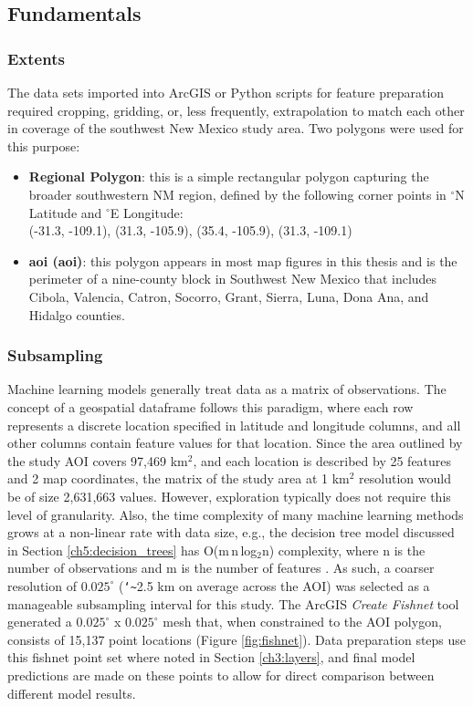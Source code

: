 \subsection{Fundamentals}

\subsubsection{Extents}

The data sets imported into ArcGIS or Python scripts for feature preparation required cropping, gridding, or, less frequently, extrapolation to match each other in coverage of the southwest New Mexico study area. Two polygons were used for this purpose:

\begin{itemize}
\item \textbf{Regional Polygon}: this is a simple rectangular polygon capturing the broader southwestern NM region, defined by the following corner points in $^\circ$N Latitude and $^\circ$E Longitude: \\ (-31.3, -109.1), (31.3, -105.9), (35.4, -105.9), (31.3, -109.1)
\item \textbf{\acrlong{aoi} (\acrshort{aoi})}: this polygon appears in most map figures in this thesis and is the perimeter of a nine-county block in Southwest New Mexico that includes Cibola, Valencia, Catron, Socorro, Grant, Sierra, Luna, Dona Ana, and Hidalgo counties.
\end{itemize}

\subsubsection{Subsampling}\label{ssn:fishnet}

Machine learning models generally treat data as a matrix of observations. The concept of a geospatial dataframe follows this paradigm, where each row represents a discrete location specified in latitude and longitude columns, and all other columns contain feature values for that location. Since the area outlined by the study AOI covers 97,469 km$^2$, and each location is described by 25 features and 2 map coordinates, the matrix of the study area at 1 km$^2$ resolution would be of size 2,631,663 values. However, exploration typically does not require this level of granularity. Also, the time complexity of many machine learning methods grows at a non-linear rate with data size, e.g., the decision tree model discussed in Section \ref{ch5:decision_trees} has O(m\,n\,log$_{2}$n) complexity, where n is the number of observations and m is the number of features \citep{sani_computational_2018}. As such, a coarser resolution of $0.025^\circ$ (\texttt{\char`\~}2.5 km on average across the AOI) was selected as a manageable subsampling interval for this study. The ArcGIS \textit{Create Fishnet} tool generated a $0.025^\circ$ x $0.025^\circ$ mesh that, when constrained to the AOI polygon, consists of 15,137 point locations (Figure \ref{fig:fishnet}). Data preparation steps use this fishnet point set where noted in Section \ref{ch3:layers}, and final model predictions are made on these points to allow for direct comparison between different model results. 

